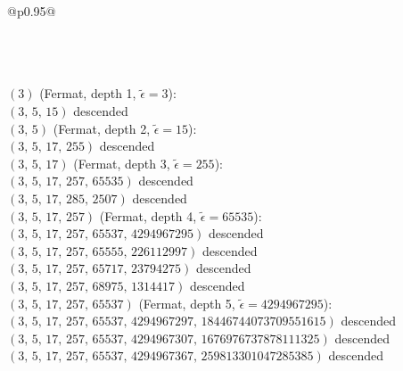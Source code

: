 \documentclass[11pt]{article}
\theoremstyle{definition}
\theoremstyle{remark}
\newcommand{\eps}{\tilde{\epsilon}}
\begin{document}
\begin{longtable}{@{}p{0.95\linewidth}@{}}
\caption{The $r \le 7$ $k = 2$-Lehmer factorizations grouped by
parent plus-seed.  Each plus-seed appears as a section header,
followed by its descended-pair and Lehmer-companion children.
Truly primitive factorizations (no plus-seed parent of either
kind) appear at the end.}\label{tab:census-organized}\\
\toprule
\endfirsthead
{}\\
\toprule
\endhead
\bottomrule
{}\\
\endfoot
\bottomrule
\endlastfoot
\textbf{$(3)$} \quad (Fermat, depth 1, $\eps = 3$): \\
\quad $(3,\,5,\,15)$ \hfill {\small descended} \\
\addlinespace
\textbf{$(3,\,5)$} \quad (Fermat, depth 2, $\eps = 15$): \\
\quad $(3,\,5,\,17,\,255)$ \hfill {\small descended} \\
\addlinespace
\textbf{$(3,\,5,\,17)$} \quad (Fermat, depth 3, $\eps = 255$): \\
\quad $(3,\,5,\,17,\,257,\,65535)$ \hfill {\small descended} \\
\quad $(3,\,5,\,17,\,285,\,2507)$ \hfill {\small descended} \\
\addlinespace
\textbf{$(3,\,5,\,17,\,257)$} \quad (Fermat, depth 4, $\eps = 65535$): \\
\quad $(3,\,5,\,17,\,257,\,65537,\,4294967295)$ \hfill {\small descended} \\
\quad $(3,\,5,\,17,\,257,\,65555,\,226112997)$ \hfill {\small descended} \\
\quad $(3,\,5,\,17,\,257,\,65717,\,23794275)$ \hfill {\small descended} \\
\quad $(3,\,5,\,17,\,257,\,68975,\,1314417)$ \hfill {\small descended} \\
\addlinespace
\textbf{$(3,\,5,\,17,\,257,\,65537)$} \quad (Fermat, depth 5, $\eps = 4294967295$): \\
\quad $(3,\,5,\,17,\,257,\,65537,\,4294967297,\,18446744073709551615)$ \hfill {\small descended} \\
\quad $(3,\,5,\,17,\,257,\,65537,\,4294967307,\,1676976737878111325)$ \hfill {\small descended} \\
\quad $(3,\,5,\,17,\,257,\,65537,\,4294967367,\,259813301047285385)$ \hfill {\small descended} \\

\end{longtable}
\end{document}

